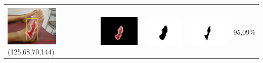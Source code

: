\begin{table}[H]
\begin{tabular}{|m{1.0in}|m{1.0in}|m{1.0in}|m{1.0in}|m{0.6in}|}
		&  &  & \\
		\includegraphics[width=1.0in]{gambar/hasil_segmentasi/luka_merah/image_8_rect.jpg} {\centering\fontsize{10}{10}\selectfont(125,68,70,144)}&
		\includegraphics[width=1.0in]{gambar/hasil_segmentasi/luka_merah/result_8.jpg}&
		\includegraphics[width=1.0in]{gambar/hasil_segmentasi/luka_merah/mask_r_8.jpg}&
		\includegraphics[width=1.0in]{gambar/hasil_segmentasi/luka_merah/8_r.jpg}&
		95,09\% \\
		\hline
	\end{tabular}
\end{table}


